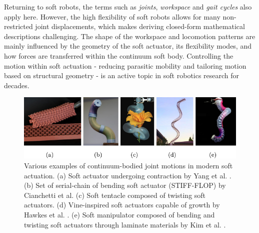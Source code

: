 Returning to soft robots, the terms such as \textit{joints}, \textit{workspace} and \textit{gait cycles} also apply here. However, the high flexibility of soft robots allows for many non-restricted joint displacements, which makes deriving closed-form mathematical descriptions challenging. The shape of the workspace and locomotion patterns are mainly influenced by the geometry of the soft actuator, its flexibility modes, and how forces are transferred within the continuum soft body. Controlling the motion within soft actuation - reducing parasitic mobility and tailoring motion based on structural geometry - is an active topic in soft robotics research for decades. \\

\begin{figure}[!t]
  \centering
  \includegraphics*[width=\textwidth]{./pdf/thesis-figurex-1-2.pdf}
  \vspace{-6mm}
  \caption{Various examples of continuum-bodied joint motions in modern soft actuation. (a) Soft actuator undergoing contraction by Yang et al. \cite{Yang2016}. (b) Set of serial-chain of bending soft actuator (STIFF-FLOP) by Cianchetti et al. \cite{Cianchetti2013Nov,Cianchetti2014} (c) Soft tentacle composed of twisting soft actuators. (d) Vine-inspired soft actuators capable of growth by Hawkes et al. \cite{Hawkes2017}. (e) Soft manipulator composed of bending and twisting soft actuators through laminate materials by Kim et al. \cite{Kim2019Aug}.}
  \label{fig:C0:actuationtypes}
\end{figure}

